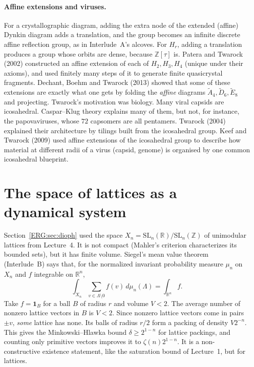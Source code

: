 \documentclass[11pt,openany]{book}
\theoremstyle{plain}
\theoremstyle{definition}
\theoremstyle{remark}
\newcommand{\R}{\mathbb{R}}
\newcommand{\Z}{\mathbb{Z}}
\newcommand{\Lat}{\Lambda}             %
\newcommand{\SL}{\mathrm{SL}}
\newcommand{\dens}{\delta}             %
\begin{document}
\paragraph{Affine extensions and viruses.} For a crystallographic diagram, adding the extra node of the
extended (affine) Dynkin diagram adds a translation, and the group becomes an infinite discrete affine
reflection group, as in Interlude~A's alcoves. For $H_r$, adding a translation produces a group whose
orbits are dense, because $\Z[\tau]$ is. Patera and Twarock (2002) constructed an affine extension of each of
$H_2,H_3,H_4$ (unique under their axioms), and used finitely many steps of it to generate finite
quasicrystal fragments.
Dechant, Boehm and Twarock (2013) showed that some of these extensions are exactly what one gets by
folding the \emph{affine} diagrams $\tilde A_4,\tilde D_6,\tilde E_8$ and projecting. Twarock's
motivation was biology. Many viral capsids are icosahedral. Caspar--Klug theory explains many of them,
but not, for instance, the papovaviruses, whose $72$ capsomers are all pentamers. Twarock (2004)
explained their architecture by tilings built from the icosahedral group. Keef and Twarock (2009) used
affine extensions of the icosahedral group to describe how material at different radii of a virus
(capsid, genome) is organised by one common icosahedral blueprint.

\section{The space of lattices as a dynamical system}
\label{ERG:sec:lattices}

Section~\ref{ERG:sec:dioph} used the space $X_n=\SL_n(\R)/\SL_n(\Z)$ of unimodular lattices from
Lecture~4. It is not compact (Mahler's criterion characterizes its bounded sets), but it has finite
volume. Siegel's mean value theorem (Interlude~B) says that, for the normalized invariant probability
measure $\mu_n$ on $X_n$ and $f$ integrable on $\R^n$,
\[
  \int_{X_n}\sum_{v\in\Lat\setminus0}f(v)\,d\mu_n(\Lat)=\int_{\R^n}f .
\]
Take $f=\mathbf 1_B$ for a ball $B$ of radius $r$ and volume $V<2$. The average number of nonzero
lattice vectors in $B$ is $V<2$. Since nonzero lattice vectors come in pairs $\pm v$, \emph{some} lattice
has none. Its balls of radius $r/2$ form a packing of density $V2^{-n}$. This gives the Minkowski--Hlawka bound
$\dens\ge2^{1-n}$ for lattice packings, and counting only primitive vectors improves it to
$\zeta(n)2^{1-n}$. It is a non-constructive existence statement, like the saturation bound of
Lecture~1, but for lattices.
\end{document}
